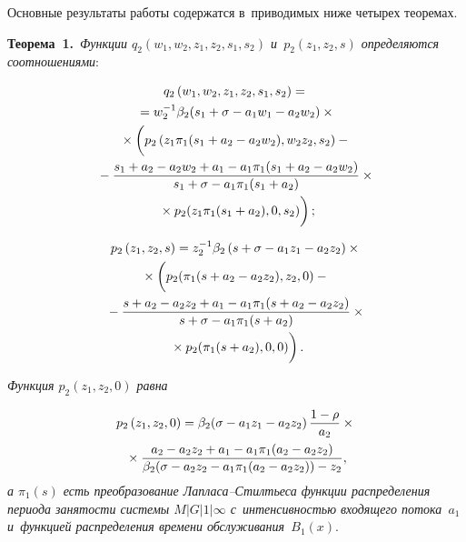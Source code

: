 \begin{multicols}{2}
\vspace*{-6pt}

Основные результаты работы содержатся в~приводимых ниже четырех теоремах.


\noindent
\textbf{Теорема~1.}\
\textit{Функции $q_2\left(w_1,w_2,z_1,z_2,s_1,s_2\right)$ 
и~$p_2\left(z_1,z_2,s\right)$  определяются соотношениями}:

\vspace*{-6pt}

\noindent
\begin{multline}
\label{n4}
q_2\left(w_1,w_2,z_1,z_2,s_1,s_2\right)={}\\
{}=
w_2^{-1}\beta_2(s_1+\sigma-a_1w_1-a_2w_2)\times{}\\
{}\times
\left(
\vphantom{\fr{s_1+a_2-a_2w_2+a_1-a_1\pi_1(s_1+a_2-a_2w_2)}{s_1+\sigma-a_1\pi_1(s_1+a_2)}}
p_2\left(z_1\pi_1(s_1+a_2-a_2w_2),w_2z_2,s_2\right)-{}\right.\\
{}-
\fr{s_1+a_2-a_2w_2+a_1-a_1\pi_1(s_1+a_2-a_2w_2)}{s_1+\sigma-a_1\pi_1(s_1+a_2)}\times{}\\
\left.{}\times
p_2(z_1\pi_1(s_1+a_2),0,s_2)
\vphantom{\fr{s_1+a_2-a_2w_2+a_1-a_1\pi_1(s_1+a_2-a_2w_2)}{s_1+\sigma-a_1\pi_1(s_1+a_2)}}
\right);
\end{multline}

\vspace*{-20pt}

\noindent
\begin{multline}
\label{n5}
p_2\left(z_1,z_2,s\right)=z_2^{-1}\beta_2\left(s+\sigma-a_1z_1-a_2z_2\right)
\times{}\\
{}\times
\left(
\vphantom{\fr{s_1+a_2-a_2w_2+a_1-a_1\pi_1(s_1+a_2-a_2w_2)}{s_1+\sigma-a_1\pi_1(s_1+a_2)}}
p_2(\pi_1(s+a_2-a_2z_2),z_2,0)-{}\right.\\
{}-
\fr{s+a_2-a_2z_2+a_1-a_1\pi_1(s+a_2-a_2z_2)}{s+\sigma-a_1\pi_1(s+a_2)}\times{}\\
\left.{}\times
p_2(\pi_1(s+a_2),0,0)
\vphantom{\fr{s_1+a_2-a_2w_2+a_1-a_1\pi_1(s_1+a_2-a_2w_2)}{s_1+\sigma-a_1\pi_1(s_1+a_2)}}
\right).
\end{multline}

\vspace*{-4pt}

\noindent
\textit{Функция $p_2\left(z_1,z_2,0\right)$ равна}

\vspace*{-9pt}

\noindent
\begin{multline}
\label{n6}
p_2\left(z_1,z_2,0\right)=\beta_2(\sigma-a_1z_1-a_2z_2)\,\displaystyle\frac{\displaystyle 1-\rho\mathstrut}{\displaystyle a_2\mathstrut}
\times{}\\
{}\times \displaystyle\frac{\displaystyle a_2-a_2z_2+a_1-a_1\pi_1(a_2-a_2z_2)\mathstrut}{\displaystyle \beta_2(\sigma-a_2z_2-a_1\pi_1(a_2-a_2z_2))-z_2\mathstrut},
\end{multline}
\textit{а $\pi_1(s)$  есть преобразование Лап\-ла\-са--Стилть\-еса функции распределения периода занятости системы $M|G|1|\infty$ с~интенсивностью входящего
потока~$a_1$ и~функцией распределения времени обслуживания~$B_1(x).$}



\end{multicols}

